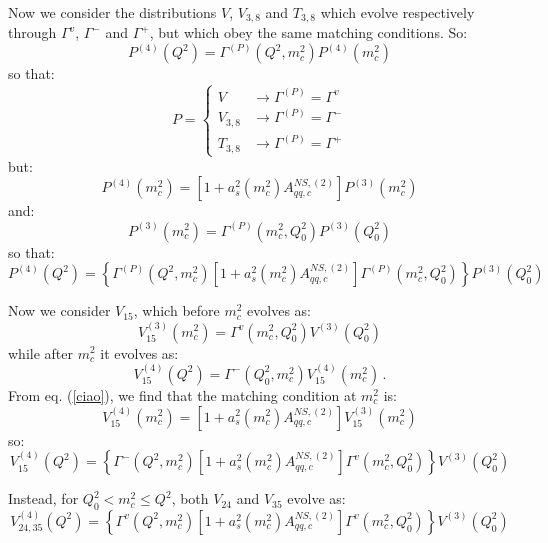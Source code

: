 \documentclass[10pt,a4paper]{article}
\begin{document}
Now we consider the distributions $V$, $V_{3,8}$ and $T_{3,8}$ which
evolve re\-spe\-cti\-ve\-ly through $\Gamma^v$, $\Gamma^-$ and
$\Gamma^+$, but which obey the same matching conditions. So:
\begin{equation}
P^{(4)}(Q^2)=\Gamma^{(P)}(Q^2,m_c^2)P^{(4)}(m_c^2)
\end{equation}
so that:
\begin{equation}
P=\left\{
\begin{array}{ll}
\displaystyle V &\rightarrow \Gamma^{(P)}=\Gamma^v\\
\displaystyle V_{3,8} &\rightarrow \Gamma^{(P)}=\Gamma^-\\
\displaystyle T_{3,8} &\rightarrow \Gamma^{(P)}=\Gamma^+
\end{array}\right.
\end{equation}
but:
\begin{equation}
P^{(4)}(m_c^2)=[1+a_s^2(m_c^2)A_{qq,c}^{N\!S,(2)}]P^{(3)}(m_c^2)
\end{equation}
and:
\begin{equation}
P^{(3)}(m_c^2)=\Gamma^{(P)}(m_c^2,Q_0^2)P^{(3)}(Q^2_0)
\end{equation}
so that:
\begin{equation}
P^{(4)}(Q^2)=\left\{\Gamma^{(P)}(Q^2,m_c^2)[1+a_s^2(m_c^2)A_{qq,c}^{N\!S,(2)}]\Gamma^{(P)}(m_c^2,Q_0^2)\right\}P^{(3)}(Q^2_0)
\end{equation}

Now we consider $V_{15}$, which before $m_c^2$ evolves as:
\begin{equation}
V_{15}^{(3)}(m_c^2)=\Gamma^{v}(m_c^2,Q_0^2)V^{(3)}(Q_0^2)
\end{equation}
while after $m_c^2$ it evolves as:
\begin{equation}
V_{15}^{(4)}(Q^2)=\Gamma^{-}(Q_0^2,m_c^2)V^{(4)}_{15}(m_c^2)\,.
\end{equation}
From eq. (\ref{ciao}), we find that the matching condition at $m_c^2$ is:
\begin{equation}
V^{(4)}_{15}(m_c^2)=[1+a_s^2(m_c^2)A_{qq,c}^{N\!S,(2)}] V^{(3)}_{15}(m_c^2)
\end{equation}
so:
\begin{equation}
V_{15}^{(4)}(Q^2)=\left\{\Gamma^{-}(Q^2,m_c^2)[1+a_s^2(m_c^2)A_{qq,c}^{N\!S,(2)}]\Gamma^{v}(m_c^2,Q_0^2)\right\}V^{(3)}(Q_0^2)
\end{equation}

Instead, for $Q_0^2<m_c^2\leq Q^2$, both $V_{24}$ and $V_{35}$ evolve as: 
\begin{equation}
V_{24,35}^{(4)}(Q^2)=\left\{\Gamma^{v}(Q^2,m_c^2)[1+a_s^2(m_c^2)A_{qq,c}^{N\!S,(2)}]\Gamma^{v}(m_c^2,Q_0^2)\right\}V^{(3)}(Q_0^2)
\end{equation}
\end{document}

